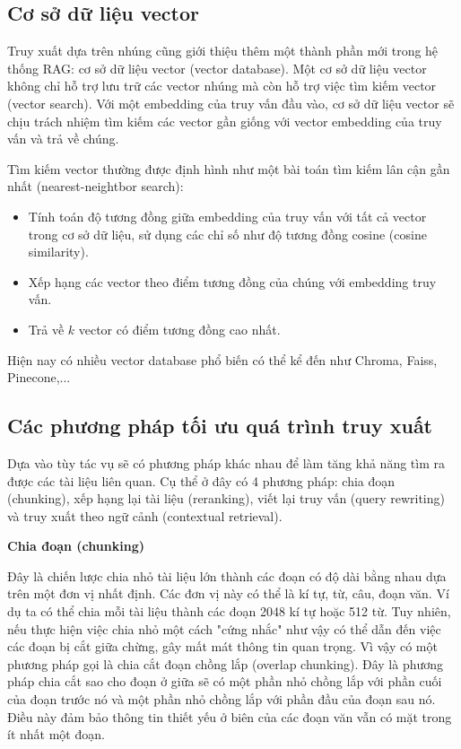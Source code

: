 \vspace{1em}
\subsection{Cơ sở dữ liệu vector}
Truy xuất dựa trên nhúng cũng giới thiệu thêm một thành phần mới trong hệ thống RAG: cơ sở dữ liệu vector (vector database). Một cơ sở dữ liệu vector không chỉ hỗ trợ lưu trữ các vector nhúng mà còn hỗ trợ việc tìm kiếm vector (vector search). Với một embedding của truy vấn đầu vào, cơ sở dữ liệu vector sẽ chịu trách nhiệm tìm kiếm các vector gần giống với vector embedding của truy vấn và trả về chúng.

Tìm kiếm vector thường được định hình như một bài toán tìm kiếm lân cận gần nhất (nearest-neightbor search):
\begin{itemize}
    \item Tính toán độ tương đồng giữa embedding của truy vấn với tất cả vector trong cơ sở dữ liệu, sử dụng các chỉ số như độ tương đồng cosine (cosine similarity).
    \item Xếp hạng các vector theo điểm tương đồng của chúng với embedding truy vấn.
    \item Trả về $k$ vector có điểm tương đồng cao nhất.
\end{itemize}
Hiện nay có nhiều vector database phổ biến có thể kể đến như Chroma, Faiss, Pinecone,...

\vspace{1em}
\subsection{Các phương pháp tối ưu quá trình truy xuất}
Dựa vào tùy tác vụ sẽ có phương pháp khác nhau để làm tăng khả năng tìm ra được các tài liệu liên quan. Cụ thể ở đây có 4 phương pháp: chia đoạn (chunking), xếp hạng lại tài liệu (reranking), viết lại truy vấn (query rewriting) và truy xuất theo ngữ cảnh (contextual retrieval).

\vspace{1em}
\textbf{Chia đoạn (chunking)}

Đây là chiến lược chia nhỏ tài liệu lớn thành các đoạn có độ dài bằng nhau dựa trên một đơn vị nhất định. Các đơn vị này có thể là kí tự, từ, câu, đoạn văn. Ví dụ ta có thể chia mỗi tài liệu thành các đoạn 2048 kí tự hoặc 512 từ. Tuy nhiên, nếu thực hiện việc chia nhỏ một cách "cứng nhắc" như vậy có thể dẫn đến việc các đoạn bị cắt giữa chừng, gây mất mát thông tin quan trọng. Vì vậy có một phương pháp gọi là chia cắt đoạn chồng lắp (overlap chunking). Đây là phương pháp chia cắt sao cho đoạn ở giữa sẽ có một phần nhỏ chồng lắp với phần cuối của đoạn trước nó và một phần nhỏ chồng lắp với phần đầu của đoạn sau nó. Điều này đảm bảo thông tin thiết yếu ở biên của các đoạn văn vẫn có mặt trong ít nhất một đoạn.

